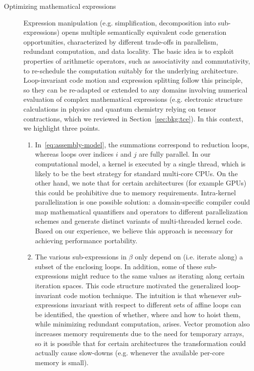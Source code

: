 \begin{description}
\item[Optimizing mathematical expressions] Expression manipulation (e.g. simplification, decomposition into sub-expressions) opens multiple semantically equivalent code generation opportunities, characterized by different trade-offs in parallelism, redundant computation, and data locality. The basic idea is to exploit properties of arithmetic operators, such as associativity and commutativity, to re-schedule the computation suitably for the underlying architecture. Loop-invariant code motion and expression splitting follow this principle, so they can be re-adapted or extended to any domains involving numerical evaluation of complex mathematical expressions (e.g. electronic structure calculations in physics and quantum chemistry relying on tensor contractions, which we reviewed in Section~\ref{sec:bkg:tce}). In this context, we highlight three points.
\begin{enumerate}
\item In~\eqref{eq:assembly-model}, the summations correspond to reduction loops, whereas loops over indices $i$ and $j$ are fully parallel. In our computational model, a kernel is executed by a single thread, which is likely to be the best strategy for standard multi-core CPUs. On the other hand, we note that for certain architectures (for example GPUs) this could be prohibitive due to memory requirements. Intra-kernel parallelization is one possible solution: a domain-specific compiler could map mathematical quantifiers and operators to different parallelization schemes and generate distinct variants of multi-threaded kernel code. Based on our experience, we believe this approach is necessary for achieving performance portability.
\item The various sub-expressions in $\beta$ only depend on (i.e. iterate along) a subset of the enclosing loops. In addition, some of these sub-expressions might reduce to the same values as iterating along certain iteration spaces. This code structure motivated the generalized loop-invariant code motion technique. The intuition is that whenever sub-expressions invariant with respect to different sets of affine loops can be identified, the question of whether, where and how to hoist them, while minimizing redundant computation, arises. Vector promotion also increases memory requirements due to the need for temporary arrays, so it is possible that for certain architectures the transformation could actually cause slow-downs (e.g. whenever the available per-core memory is small).

\end{enumerate}
\end{description}
